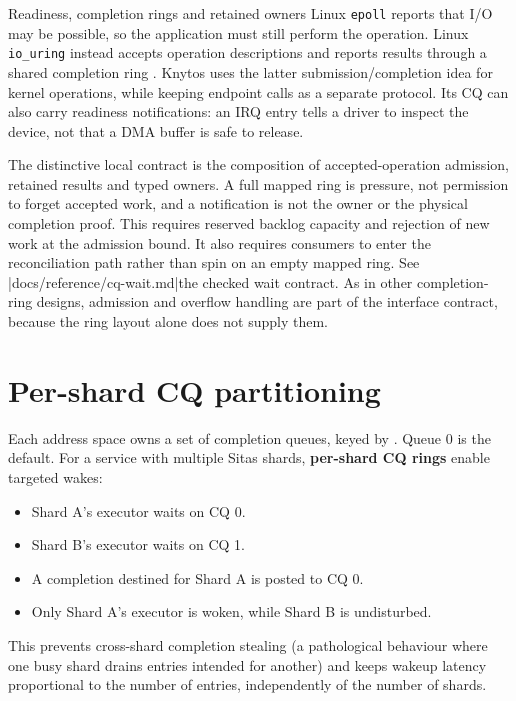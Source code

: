 \begin{architecturalcomparison}{Readiness, completion rings and retained owners}
Linux \texttt{epoll} reports that I/O may be possible, so the application must
still perform the operation. Linux \texttt{io\_uring} instead accepts operation
descriptions and reports results through a shared completion ring
\cite{prior:epoll,prior:io-uring}. Knytos uses the latter
submission/completion idea for kernel operations, while keeping endpoint
calls as a separate protocol. Its CQ can also carry readiness notifications:
an IRQ entry tells a driver to inspect the device, not that a DMA buffer is
safe to release.

The distinctive local contract is the composition of accepted-operation
admission, retained results and typed owners. A full mapped ring is pressure,
not permission to forget accepted work, and a notification is not the owner or
the physical completion proof. This requires reserved backlog capacity and
rejection of new work at the admission bound. It also requires consumers to
enter the reconciliation path rather than spin on an empty mapped ring.
See \repofiletext|docs/reference/cq-wait.md|{the checked wait contract}.
As in other completion-ring designs, admission and overflow handling are part
of the interface contract, because the ring layout alone does not supply them.
\end{architecturalcomparison}

\section{Per-shard CQ partitioning}

Each address space owns a set of completion queues, keyed by . Queue
0 is the default. For a service with multiple Sitas shards, \textbf{per-shard CQ
rings} enable targeted wakes:

\begin{itemize}
    \item Shard A's executor waits on CQ 0.
    \item Shard B's executor waits on CQ 1.
    \item A completion destined for Shard A is posted to CQ 0.
    \item Only Shard A's executor is woken, while Shard B is undisturbed.
\end{itemize}

This prevents cross-shard completion stealing (a pathological behaviour where one
busy shard drains entries intended for another) and keeps wakeup latency
proportional to the number of entries, independently of the number of shards.

